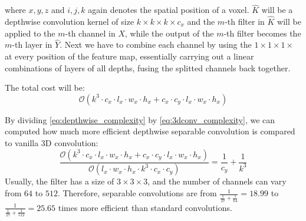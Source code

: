 where $x, y, z$ and $i, j, k$ again denotes the spatial position of a voxel.
$\hat{K}$ will be a depthwise convolution kernel of size $k \times k \times k
\times c_x$ and the $m$-th filter in $\hat{K}$ will be applied to the $m$-th
channel in $X$, while the output of the $m$-th filter becomes the $m$-th layer
in $\hat{Y}$. Next we have to combine each channel by using the $1 \times 1
\times 1 \times$ at every position of the feature map, essentially carrying out
a linear combinations of layers of all depths, fusing the splitted channels back
together.

The total cost will be:
\begin{equation}
  \label{eq:depthwise_complexity}
  \mathcal{O}(k^3 \cdot c_x \cdot l_x \cdot w_x \cdot h_x + c_x \cdot c_y \cdot
  l_x \cdot w_x \cdot h_x)
\end{equation}

By dividing \ref{eq:depthwise_complexity} by \ref{eq:3dconv_complexity}, we can
computed how much more efficient depthwise separable convolution is compared to
vanilla 3D convolution:
\begin{equation}
  \label{eq:depthwise_efficiency}
  \frac{\mathcal{O}(k^3 \cdot c_x \cdot l_x \cdot w_x \cdot h_x + c_x \cdot c_y
  \cdot l_x \cdot w_x \cdot h_x)}{\mathcal{O}(l_x \cdot w_x \cdot h_x \cdot k^3
  \cdot c_x \cdot c_y)} = \frac{1}{c_y} + \frac{1}{k^3}
\end{equation}
Usually, the filter has a size of $3 \times 3 \times 3$, and the number of
channels can vary from $64$ to $512$. Therefore, separable convolutions are from
$\frac{1}{\frac{1}{27} + \frac{1}{64}} = 18.99$ to $\frac{1}{\frac{1}{27} +
\frac{1}{512}} = 25.65$ times more efficient than standard convolutions.

